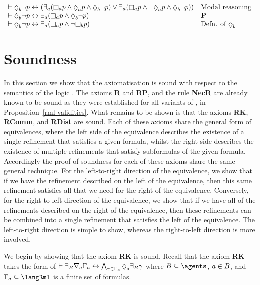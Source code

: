 \begin{example}
$$\begin{array}{ll}
    \proves \possibleB \lnot \atomP \iff (\somerefsA (\necessaryA \atomP \land \possibleA \atomP \land \possibleB \lnot \atomP) \lor \somerefsA (\necessaryA \atomP \land \lnot \possibleA \atomP \land \possibleB \lnot \atomP)) & \text{Modal reasoning}\\
    \proves \possibleB \lnot \atomP \iff \somerefsA (\necessaryA \atomP \land \possibleB \lnot \atomP) & {\bf P}\\
    \proves \possibleB \lnot \atomP \iff \somerefsA (\necessaryA \atomP \land \lnot \necessaryB \atomP) & \text{Defn. of $\possibleB$}
\end{array}
$$
\end{example}

\section{Soundness}\label{rml-k-soundness}

In this section we show that the axiomatisation \axiomRmlK{} is sound with respect to the semantics of the logic \logicRmlK{}.
The axioms {\bf R} and {\bf RP}, and the rule {\bf NecR} are already known to be sound as they were established for all variants of \logicRml{}, in Proposition~\ref{rml-validities}.
What remains to be shown is that the axioms {\bf RK}, {\bf RComm}, and {\bf RDist} are sound.
Each of these axioms share the general form of equivalences, where the left side of the equivalence describes the existence of a single refinement that satisfies a given formula, whilst the right side describes the existence of multiple refinements that satisfy subformulas of the given formula.
Accordingly the proof of soundness for each of these axioms share the same general technique.
For the left-to-right direction of the equivalence, we show that if we have the refinement described on the left of the equivalence, then this same refinement satisfies all that we need for the right of the equivalence.
Conversely, for the right-to-left direction of the equivalence, we show that if we have all of the refinements described on the right of the equivalence, then these refinements can be combined into a single refinement that satisfies the left of the equivalence.
The left-to-right direction is simple to show, whereas the right-to-left direction is more involved.

We begin by showing that the axiom {\bf RK} is sound.
Recall that the axiom {\bf RK} takes the form of $\proves \somerefsBs \coversA \Gamma_\agentA \iff \bigwedge_{\gamma \in \Gamma_\agentA} \possibleA \somerefsBs \gamma$ where $\agentsB \subseteq \agents$, $a \in B$, and $\Gamma_\agentA \subseteq \langRml$ is a finite set of formulas.

